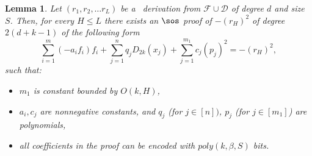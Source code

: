 \documentclass[11pt]{article}
\newtheorem{lemma}[theorem]{Lemma}
\begin{document}
%




%

\begin{lemma}\label{th:sos_sim_PC_1}
    Let $(r_1, r_2, \dots r_L)$ be a \PC\ derivation from $\mathcal{F}\cup \mathcal{D}$ of degree $d$ and size $S$. Then, for every $H\leq L$ there exists an $\sos$ proof of $-(r_H)^2$ of degree $2(d+k-1)$ of the following form
    \begin{equation}\label{eq:sosstep}
         \sum_{i=1}^m (-a_i f_i) f_i + \sum_{j=1}^{n} q_j D_{2k}(x_j) +\sum_{j=1}^{m_1} c_{j}(p_{j})^2=-(r_H)^2,
    \end{equation}
    such that:
    \begin{itemize}
        \item $m_1$ is constant bounded by $O(k, H)$,
        \item $a_i, c_j$ are nonnegative constants, and $q_j$ (for $j\in [n])$, $p_j$ (for $j\in [m_1]$) are polynomials,
        
        \item all coefficients in the proof can be encoded with $poly(k, \beta, S)$ bits.
    \end{itemize}
\end{lemma}
\end{document}
